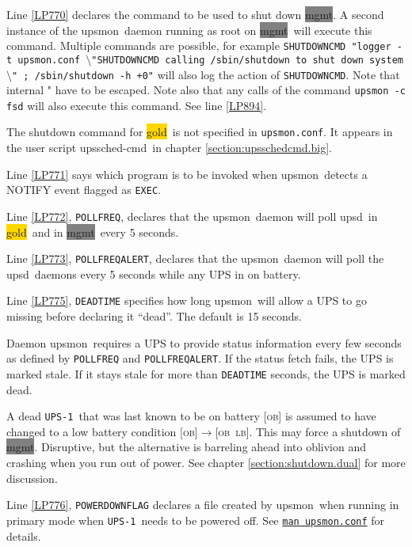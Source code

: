 \documentclass[12pt]{article}
\newcommand{\bsl}{$\setminus$}       %
\newcommand{\upsd}{\mbox{\textcolor{UPSDCOLOUR}{upsd}}}
\newcommand{\upsmon}{\mbox{\textcolor{MONCOLOUR}{upsmon}}}
\newcommand{\upsschedcmd}{\mbox{\textcolor{CMDCOLOUR}{upssched-cmd}}}
\newcommand{\gold}[1][gold]{\colorbox{GOLD}{#1}}
\newcommand{\mgmt}[1][mgmt]{\colorbox{GRAY}{#1}}
\newcommand{\LB}{\textcolor{UPSDCOLOUR}{\textsc{lb}}}
\newcommand{\OB}{\textcolor{UPSDCOLOUR}{\textsc{ob}}}
\newcommand{\status}[1]{\textcolor{UPSDCOLOUR}{[{#1}]}}
\newcommand{\statuschange}[2]{\status{#1}{\allowbreak}\textcolor{UPSDCOLOUR}{$\rightarrow$}{\allowbreak}\status{#2}}
\newcommand{\UPSi}{\texttt{UPS-1}}
\newcommand{\upsmonconf}{\textcolor{MONCOLOUR}{\texttt{upsmon.conf}}}
\newcommand{\NUTman}[1]{\href{https://networkupstools.org/docs/man/#1.html}{\texttt{man #1}}}
\begin{document}
Line \ref{LP770} declares the command to be used to shut down \mgmt.
A second instance of the \upsmon\ daemon running as root on
\mgmt\ will execute this command.  Multiple commands are possible, for
example \texttt{SHUTDOWNCMD "logger -t upsmon.conf \bsl"SHUTDOWNCMD
  calling /sbin/shutdown to shut down system\bsl" ; /sbin/shutdown -h
  +0"} will also log the action of \texttt{SHUTDOWNCMD}.  Note that
internal " have to be escaped.  Note also that any calls of the
command \texttt{upsmon -c fsd} will also execute this command.  See
line \ref{LP894}.

The shutdown command for \gold\ is not specified in \upsmonconf.  It appears
in the user script \upsschedcmd\ in chapter \ref{section:upsschedcmd.big}.

Line \ref{LP771} says which program is to be invoked when \upsmon\ detects a
NOTIFY event flagged as \texttt{EXEC}.

Line \ref{LP772}, \texttt{POLLFREQ}, declares that the \upsmon\ daemon will
poll \upsd\ in \gold\ and in \mgmt\ every 5 seconds.

Line \ref{LP773}, \texttt{POLLFREQALERT}, declares that the \upsmon\ daemon
will poll the \upsd\ daemons every 5 seconds while any UPS in on battery.

Line \ref{LP775}, \texttt{DEADTIME} specifies how long \upsmon\ will allow a
UPS to go missing before declaring it ``dead''. The default is 15 seconds.

Daemon \upsmon\ requires a UPS to provide status information every few seconds
as defined by \texttt{POLLFREQ} and \texttt{POLLFREQALERT}. If the status
fetch fails, the UPS is marked stale. If it stays stale for more than
\texttt{DEADTIME} seconds, the UPS is marked dead.

A dead \UPSi\ that was last known to be on battery \status{\OB} is assumed to
have changed to a low battery condition \statuschange{\OB}{\OB\ \LB}. This may
force a shutdown of \mgmt. Disruptive, but the alternative is barreling ahead
into oblivion and crashing when you run out of power.  See chapter
\ref{section:shutdown.dual} for more discussion.

Line \ref{LP776}, \texttt{POWERDOWNFLAG} declares a file created by
\upsmon\ when running in primary mode when \UPSi\ needs to be powered off.  See
\NUTman{upsmon.conf} for details.
\end{document}
